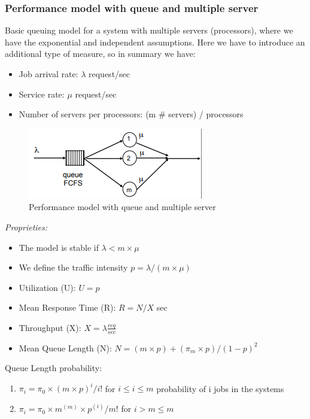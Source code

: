 \subsubsection{Performance model with queue and multiple server}
Basic queuing model for a system with multiple servers (processors), where we have the exponential and independent assumptions. Here we have to introduce an additional type of measure, so in summary we have:
\begin{itemize}
    \item Job arrival rate: 				\(\lambda\) 	request/sec
    \item Service rate: 				    \(\mu\) 	request/sec
    \item Number of servers per processors: 	(m \(\#\) servers) / processors
\end{itemize}
\begin{figure}[!h]
            \centering
            \includegraphics[width=.7\linewidth]{images/modelOfSystems/PerformanceModelWithQueueAndMultipleServer.png}
            \caption{Performance model with queue and multiple server
}
    \end{figure}


\textit{Proprieties:}
\begin{itemize}
    \item The model is stable if \(\lambda < m \times \mu\)
    \item We define the traffic intensity \(p = \lambda / (m \times\mu)\)
    \item Utilization (U): 			\(U = p\)
    \item Mean Response Time (R):	\(R = N / X\) sec
    \item Throughput (X):		    \(X = \lambda \frac{req}{sec}\)
    \item Mean Queue Length (N):	\(N = (m \times p) + (\pi_m \times p) / (1 - p)^2\)
\end{itemize}
Queue Length probability: 
\begin{enumerate}
    \item \(\pi_i = \pi_0 \times (m \times p )^i / i!\) for \(i \leq i \leq m\) probability of i jobs in the systems
    \item \(\pi_i = \pi_0 \times m^{(m)} \times p^{(i)} / m!\) for \(i > m \leq m\)
\end{enumerate}

